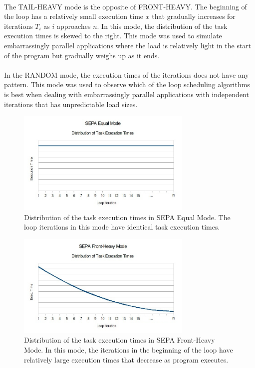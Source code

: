 \documentclass[10pt, twocolumn, letterpaper]{article}
\begin{document}
\paragraph{}
The \textsf{TAIL-HEAVY} mode is the opposite of \textsf{FRONT-HEAVY}. The beginning of the loop has a relatively small execution time $x$ that gradually increases for iterations $T_i$ as $i$ approaches $n$. In this mode, the distribution of the task execution times is skewed to the right. This mode was used to simulate embarrassingly parallel applications where the load is relatively light in the start of the program but gradually weighs up as it ends.

\paragraph{}
In the \textsf{RANDOM} mode, the execution times of the iterations does not have any pattern. This mode was used to observe which of the loop scheduling algorithms is best when dealing with embarrassingly parallel applications with independent iterations that has unpredictable load sizes.

\begin{figure}[h]
\begin{center}  
  \includegraphics[height=50mm]{graphs/exectime/equalmode.jpg}
  \caption{Distribution of the task execution times in SEPA Equal Mode. The loop iterations in this mode have identical task execution times.}
\end{center}
\end{figure}


\begin{figure}[h]
\begin{center}  
  \includegraphics[height=50mm]{graphs/exectime/front-heavymode.jpg}
  \caption{Distribution of the task execution times in SEPA Front-Heavy Mode. In this mode, the iterations in the beginning of the loop have relatively large execution times that decrease as program executes.}
\end{center}
\end{figure}
\end{document}
